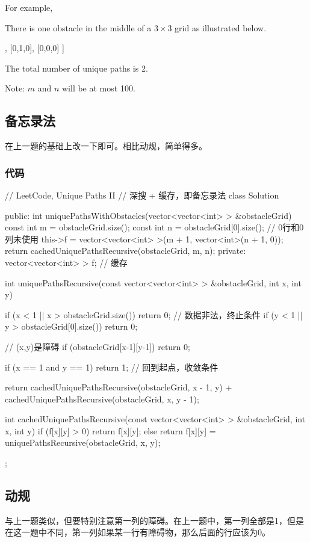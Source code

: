 For example,

There is one obstacle in the middle of a $3 \times 3$ grid as illustrated below.
\begin{Code}
[
  [0,0,0],
  [0,1,0],
  [0,0,0]
]
\end{Code}

The total number of unique paths is 2.

Note: $m$ and $n$ will be at most 100.


\subsection{备忘录法}
在上一题的基础上改一下即可。相比动规，简单得多。

\subsubsection{代码}
\begin{Code}
// LeetCode, Unique Paths II
// 深搜 + 缓存，即备忘录法
class Solution {
public:
    int uniquePathsWithObstacles(vector<vector<int> > &obstacleGrid) {
        const int m = obstacleGrid.size();
        const int n = obstacleGrid[0].size();
        // 0行和0列未使用
        this->f = vector<vector<int> >(m + 1, vector<int>(n + 1, 0));
        return cachedUniquePathsRecursive(obstacleGrid, m, n);
    }
private:
    vector<vector<int> > f;  // 缓存

    int uniquePathsRecursive(const vector<vector<int> > &obstacleGrid,
            int x, int y) {
        if (x < 1 || x > obstacleGrid.size()) return 0; // 数据非法，终止条件
        if (y < 1 || y > obstacleGrid[0].size()) return 0;

        // (x,y)是障碍
        if (obstacleGrid[x-1][y-1]) return 0;

        if (x == 1 and y == 1) return 1; // 回到起点，收敛条件

        return cachedUniquePathsRecursive(obstacleGrid, x - 1, y) +
                cachedUniquePathsRecursive(obstacleGrid, x, y - 1);
    }

    int cachedUniquePathsRecursive(const vector<vector<int> > &obstacleGrid,
            int x, int y) {
        if (f[x][y] > 0) return f[x][y];
        else return f[x][y] = uniquePathsRecursive(obstacleGrid, x, y);
    }
};
\end{Code}


\subsection{动规}
与上一题类似，但要特别注意第一列的障碍。在上一题中，第一列全部是1，但是在这一题中不同，第一列如果某一行有障碍物，那么后面的行应该为0。


